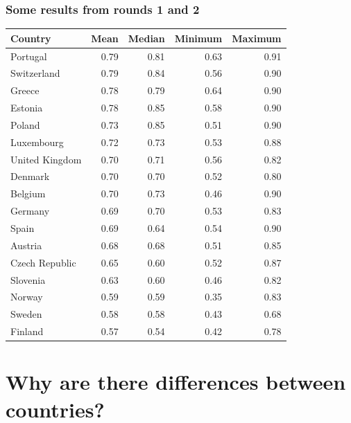 \documentclass{beamer}
\begin{document}
\begin{frame}
\frametitle{Some results from rounds 1 and 2}
\begin{table}[hbt]\centering\begin{footnotesize}
\begin{tabular}{lrrrr}
\hline
Country&Mean&Median&Minimum&Maximum\\\hline
Portugal&0.79&0.81&0.63&0.91\\
Switzerland&0.79&0.84&0.56&0.90\\
Greece&0.78&0.79&0.64&0.90\\
Estonia&0.78&0.85&0.58&0.90\\
Poland&0.73&0.85&0.51&0.90\\
Luxembourg&0.72&0.73&0.53&0.88\\
United Kingdom&0.70&0.71&0.56&0.82\\
Denmark&0.70&0.70&0.52&0.80\\
Belgium&0.70&0.73&0.46&0.90\\
Germany&0.69&0.70&0.53&0.83\\
Spain&0.69&0.64&0.54&0.90\\
Austria&0.68&0.68&0.51&0.85\\
Czech Republic&0.65&0.60&0.52&0.87\\
Slovenia&0.63&0.60&0.46&0.82\\
Norway&0.59&0.59&0.35&0.83\\
Sweden&0.58&0.58&0.43&0.68\\
Finland&0.57&0.54&0.42&0.78\\
	\hline
\end{tabular}\end{footnotesize}
\end{table}
\end{frame}

\section{Why are there differences between countries?}
\end{document}
